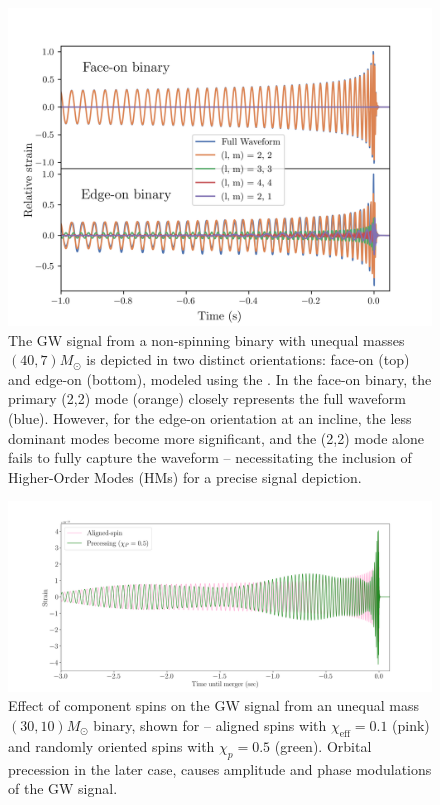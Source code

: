 \begin{figure}
    \centering
    \includegraphics[width=\textwidth]{figures/HM_and_precession/HMs-plots.png}
    \caption{The GW signal from a non-spinning binary with unequal masses $(40,7)M_{\odot}$ is depicted in two distinct orientations: face-on (top) and edge-on (bottom), modeled using the . In the face-on binary, the primary (2,2) mode (orange) closely represents the full waveform (blue). However, for the edge-on orientation at an incline, the less dominant modes become more significant, and the (2,2) mode alone fails to fully capture the waveform – necessitating the inclusion of Higher-Order Modes (HMs) for a precise signal depiction.} 
    \label{fig:HMs-plot}
\end{figure}


\begin{figure}
    \centering
    \includegraphics[width=\textwidth]{figures/HM_and_precession/precessing-wf.png}
    \caption{Effect of component spins on the GW signal from an unequal mass $(30,10)M_{\odot}$ binary, shown for -- aligned spins with $\chi_{\text{eff}} = 0.1$ (pink) and randomly oriented spins with $\chi_{p} = 0.5$ (green). Orbital precession in the later case, causes amplitude and phase modulations of the GW signal.} 
    \label{fig:precessing-wf}
\end{figure}


